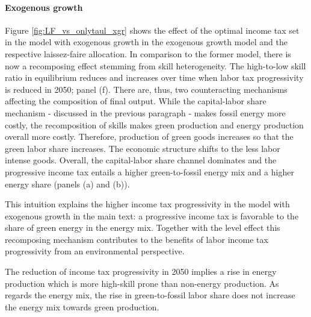 \paragraph{Exogenous growth}
Figure \ref{fig:LF_vs_onlytaul_xgr} shows the effect of the optimal income tax set in the model with exogenous growth in the exogenous growth model and the respective laissez-faire allocation. 
In comparison to the former model, there is now a recomposing effect stemming from skill heterogeneity. The high-to-low skill ratio in equilibrium reduces and increases over time when labor tax progressivity is reduced in 2050; panel (f). There are, thus, two counteracting mechanisms affecting the composition of final output. While the 
capital-labor share mechanism - discussed in the previous paragraph - makes fossil energy more costly, the recomposition of skills makes green production and energy production overall more costly. Therefore, production of green goods increases so that the green labor share increases. The economic structure shifts to the less labor intense goods.
Overall, the capital-labor share channel dominates and the progressive income tax entails a higher green-to-fossil energy mix and a higher energy share (panels (a) and (b)). 

This intuition explains the higher income tax progressivity in the model with exogenous growth in the main text: a progressive income tax is favorable to the share of green energy in the energy mix. Together with the level effect this recomposing mechanism contributes to the benefits of labor income tax progressivity from an environmental perspective. 

The reduction of income tax progressivity in 2050 implies a rise in energy production which is more high-skill prone than non-energy production. As regards the energy mix, the rise in green-to-fossil labor share does not increase the energy mix towards green production. %

